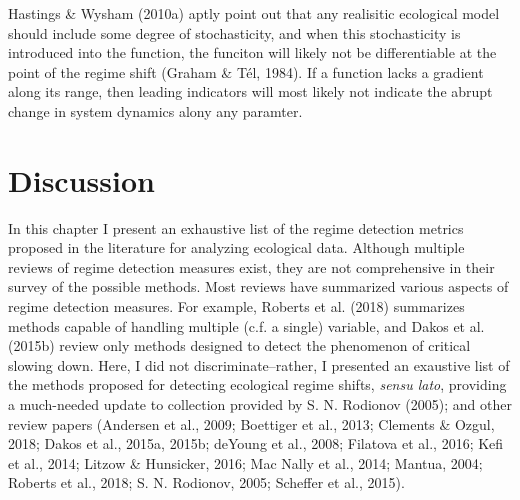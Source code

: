 \documentclass[12pt,twoside,openany]{reedthesis}
\begin{document}
Hastings \& Wysham (2010a) aptly point out that any realisitic ecological model should include some degree of stochasticity, and when this stochasticity is introduced into the function, the funciton will likely not be differentiable at the point of the regime shift (Graham \& Tél, 1984). If a function lacks a gradient along its range, then leading indicators will most likely not indicate the abrupt change in system dynamics alony any paramter.

\hypertarget{discussion}{%
\section{Discussion}\label{discussion}}

In this chapter I present an exhaustive list of the regime detection metrics proposed in the literature for analyzing ecological data. Although multiple reviews of regime detection measures exist, they are not comprehensive in their survey of the possible methods. Most reviews have summarized various aspects of regime detection measures. For example, Roberts et al. (2018) summarizes methods capable of handling multiple (c.f. a single) variable, and Dakos et al. (2015b) review only methods designed to detect the phenomenon of critical slowing down. Here, I did not discriminate--rather, I presented an exaustive list of the methods proposed for detecting ecological regime shifts, \emph{sensu lato}, providing a much-needed update to collection provided by S. N. Rodionov (2005); and other review papers (Andersen et al., 2009; Boettiger et al., 2013; Clements \& Ozgul, 2018; Dakos et al., 2015a, 2015b; deYoung et al., 2008; Filatova et al., 2016; Kefi et al., 2014; Litzow \& Hunsicker, 2016; Mac Nally et al., 2014; Mantua, 2004; Roberts et al., 2018; S. N. Rodionov, 2005; Scheffer et al., 2015).
\end{document}
